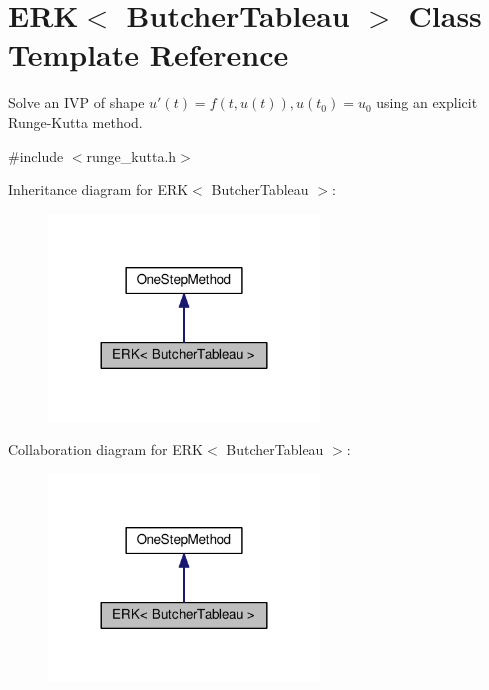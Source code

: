 \hypertarget{classERK}{}\section{E\+RK$<$ Butcher\+Tableau $>$ Class Template Reference}
\label{classERK}


Solve an I\+VP of shape $u'(t) = f(t, u(t)), u(t_0) = u_0$ using an explicit Runge-\/\+Kutta method.  




{\ttfamily \#include $<$runge\+\_\+kutta.\+h$>$}



Inheritance diagram for E\+RK$<$ Butcher\+Tableau $>$\+:\nopagebreak
\begin{figure}[H]
\begin{center}
\leavevmode
\includegraphics[width=204pt]{classERK__inherit__graph}
\end{center}
\end{figure}


Collaboration diagram for E\+RK$<$ Butcher\+Tableau $>$\+:\nopagebreak
\begin{figure}[H]
\begin{center}
\leavevmode
\includegraphics[width=204pt]{classERK__coll__graph}
\end{center}
\end{figure}
